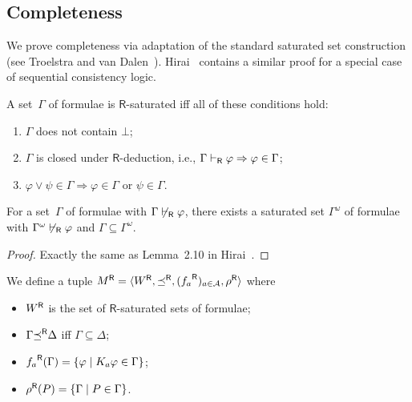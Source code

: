   \subsection{Completeness}
  We prove completeness via
  adaptation of the standard saturated set construction (see Troelstra
  and van Dalen~\cite[Ch.~2]{troelstra1988constructivism}).
  Hirai~\cite{hirailpar} contains a similar proof for a special case of
  sequential consistency logic.

  \begin{definition}
   A set~$\Gamma$ of formulae is
   $\mathsf R$-saturated iff all of these conditions hold:
   \begin{enumerate}
    \item $\Gamma$ does not contain $\bot$;
    \item $\Gamma$ is closed under $\mathsf R$-deduction, i.e.,
	  $\Gamma\vdash_{\mathsf R}\varphi\Rightarrow\varphi\in\Gamma$;
    \item $\varphi\vee\psi\in\Gamma\Rightarrow\varphi\in\Gamma$ or $\psi\in\Gamma$.
   \end{enumerate}
  \end{definition}

  \begin{proposition}
   \label{hoe:saturation}
   For a set~$\Gamma$ of formulae with $\Gamma\not\vdash_{\mathsf R}\varphi$,
   there exists a
   saturated set $\Gamma^{\omega}$ of formulae with
   $\Gamma^{\omega}\not\vdash_{\mathsf R}\varphi$ and
   $\Gamma\subseteq \Gamma^{\omega}$.
  \end{proposition}
  \begin{proof}
   Exactly the same as Lemma~2.10 in Hirai~\cite{hirailpar}.
  \end{proof}


  \begin{definition}
   We define a tuple
   ${M}^{\mathsf R} = \langle{{W}^{\mathsf R}, {\preceq}^{\mathsf R}, ({f_a}^{\mathsf R})_{a\in \mathcal A}, {\rho}^{\mathsf R}}\rangle$
   where
   \begin{itemize}
    \item ${W}^{\mathsf R}$ is the set of $\mathsf R$-saturated sets of formulae;
    \item $\Gamma{\preceq}^{\mathsf R} \Delta$ iff $\Gamma\subseteq\Delta$;
    \item ${f_a}^{\mathsf R}(\Gamma) = \{\varphi\mid K_a\varphi\in\Gamma\}$;
    \item ${\rho}^{\mathsf R}(P)=\{\Gamma\mid P\in \Gamma\}$.
   \end{itemize}
  \end{definition}

